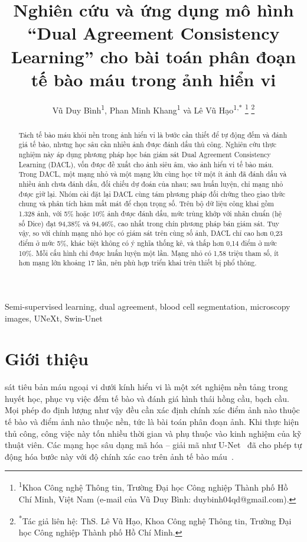 \documentclass{IEEEtran}
\begin{document}
\renewcommand{\IEEEkeywordsname}{Từ khóa}
\renewcommand{\refname}{Tài liệu tham khảo}

\title{Nghiên cứu và ứng dụng mô hình ``Dual Agreement Consistency Learning'' cho bài toán phân đoạn tế bào máu trong ảnh hiển vi}
\author{Vũ Duy Bình\textsuperscript{1}, Phan Minh Khang\textsuperscript{1} và Lê Vũ Hạo\textsuperscript{1,*}
\thanks{\textsuperscript{1}Khoa Công nghệ Thông tin, Trường Đại học Công nghiệp Thành phố Hồ Chí Minh, Việt Nam (e-mail của Vũ Duy Bình: duybinh04qd@gmail.com).}
\thanks{\textsuperscript{*}Tác giả liên hệ: ThS. Lê Vũ Hạo, Khoa Công nghệ Thông tin, Trường Đại học Công nghiệp Thành phố Hồ Chí Minh.}}

\maketitle

\begin{abstract}
Tách tế bào máu khỏi nền trong ảnh hiển vi là bước cần thiết để tự động đếm và đánh giá tế bào, nhưng học sâu cần nhiều ảnh được đánh dấu thủ công. Nghiên cứu thực nghiệm này áp dụng phương pháp học bán giám sát Dual Agreement Consistency Learning (DACL), vốn được đề xuất cho ảnh siêu âm, vào ảnh hiển vi tế bào máu. Trong DACL, một mạng nhỏ và một mạng lớn cùng học từ một ít ảnh đã đánh dấu và nhiều ảnh chưa đánh dấu, đối chiếu dự đoán của nhau; sau huấn luyện, chỉ mạng nhỏ được giữ lại. Nhóm cài đặt lại DACL cùng tám phương pháp đối chứng theo giao thức chung và phân tích hàm mất mát để chọn trọng số. Trên bộ dữ liệu công khai gồm 1.328 ảnh, với 5\% hoặc 10\% ảnh được đánh dấu, mức trùng khớp với nhãn chuẩn (hệ số Dice) đạt 94,38\% và 94,46\%, cao nhất trong chín phương pháp bán giám sát. Tuy vậy, so với chính mạng nhỏ học có giám sát trên cùng số ảnh, DACL chỉ cao hơn 0,23 điểm ở mức 5\%, khác biệt không có ý nghĩa thống kê, và thấp hơn 0,14 điểm ở mức 10\%. Mỗi cấu hình chỉ được huấn luyện một lần. Mạng nhỏ có 1,58 triệu tham số, ít hơn mạng lớn khoảng 17 lần, nên phù hợp triển khai trên thiết bị phổ thông.
\end{abstract}

\begin{IEEEkeywords}
Semi-supervised learning, dual agreement, blood cell segmentation, microscopy images, UNeXt, Swin-Unet
\end{IEEEkeywords}

\section{Giới thiệu}
\label{sec:introduction}
 sát tiêu bản máu ngoại vi dưới kính hiển vi là một xét nghiệm nền tảng trong huyết học, phục vụ việc đếm tế bào và đánh giá hình thái hồng cầu, bạch cầu. Mọi phép đo định lượng như vậy đều cần xác định chính xác điểm ảnh nào thuộc tế bào và điểm ảnh nào thuộc nền, tức là bài toán phân đoạn ảnh. Khi thực hiện thủ công, công việc này tốn nhiều thời gian và phụ thuộc vào kinh nghiệm của kỹ thuật viên. Các mạng học sâu dạng mã hóa -- giải mã như U-Net~\cite{unet} đã cho phép tự động hóa bước này với độ chính xác cao trên ảnh tế bào máu~\cite{depto}.
\end{document}
